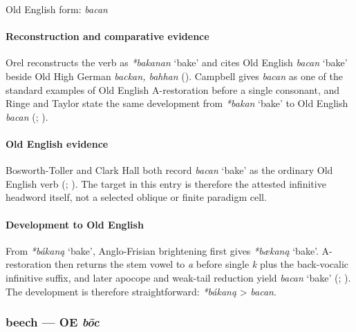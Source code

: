 \documentclass[
  british,
  a4paper,
]{article}
\providecommand{\Recon}[1]{\emph{*#1}}
\begin{document}
Old English form: \emph{bacan}

\paragraph{Reconstruction and comparative
evidence}\label{reconstruction-and-comparative-evidence-1}

Orel reconstructs the verb as \Recon{bakanan} `bake' and cites Old
English {\emph{bacan}} `bake' beside Old High German \emph{backan,
bahhan} (). Campbell gives
{\emph{bacan}} as one of the standard examples of Old English
A-restoration before a single consonant, and Ringe and Taylor state the
same development from \Recon{bakan} `bake' to Old English {\emph{bacan}}
(;
).

\paragraph{Old English evidence}\label{old-english-evidence-1}

Bosworth-Toller and Clark Hall both record {\emph{bacan}} `bake' as the
ordinary Old English verb (; ).
The target in this entry is therefore the attested infinitive headword
itself, not a selected oblique or finite paradigm cell.

\paragraph{Development to Old
English}\label{development-to-old-english-1}

From \Recon{bákaną} `bake', Anglo-Frisian brightening first gives
\Recon{bækaną} `bake'. A-restoration then returns the stem vowel to
\emph{a} before single \emph{k} plus the back-vocalic infinitive suffix,
and later apocope and weak-tail reduction yield {\emph{bacan}} `bake'
(;
). The development
is therefore straightforward: \Recon{bákaną} \textgreater{}
{\emph{bacan}}.

\subsubsection{\texorpdfstring{beech --- OE
\emph{bōc}}{beech --- OE bōc}}\label{beech-oe-bux14dc}
\end{document}
